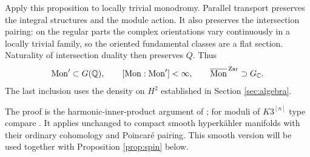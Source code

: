 Apply this proposition to locally trivial monodromy. Parallel
transport preserves the integral structures and the module action.
It also preserves the intersection pairing: on the regular parts
the complex orientations vary continuously in a locally trivial
family, so the oriented fundamental classes are a flat section.
Naturality of intersection duality then preserves $Q$. Thus
\begin{equation}\label{eq:monodromy-spin}
 \operatorname{Mon}'\subset G(\mathbb Q),\qquad [\operatorname{Mon}:\operatorname{Mon}']<\infty,
 \qquad \overline{\operatorname{Mon}}^{\,\mathrm{Zar}}\supset G_{\mathbb C}.
\end{equation}
The last inclusion uses the density on $H^2$ established in
Section \ref{sec:algebra}.

The proof is the harmonic-inner-product argument of
\cite[Theorem~3.5]{verbitsky13}; for moduli of $K3^{[n]}$ type
compare \cite[Lemma~4.13]{markman08}. It applies unchanged to
compact smooth hyperk\"ahler manifolds with their ordinary
cohomology and Poincar\'e pairing. This smooth version will be
used together with Proposition \ref{prop:spin} below.
